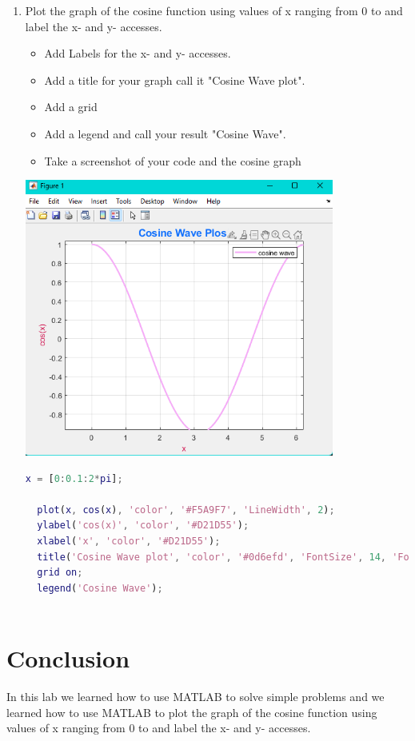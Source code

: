 \documentclass[12pt,a4paper]{article}
\begin{document}
\begin{enumerate}
\begin{lstlisting}[language=Matlab, float=h, frame=tb, label=zebra, caption={output}]
\end{lstlisting}~\\[3cm]        
\item Plot the graph of the cosine function using values of x ranging from 0 to and label the x- and y- accesses.
\begin{itemize}
  \item Add Labels for the x- and y- accesses.
  \item Add a title for your graph call it "Cosine Wave plot". 
  \item Add a grid
  \item Add a legend and call your result "Cosine Wave".
  \item Take a screenshot of your code and the cosine graph
\end{itemize}
\includegraphics[width=0.8\textwidth]{images/Picture6.png}~\\[2cm]
\begin{lstlisting}[language=Matlab,style=mystyle]
  x = [0:0.1:2*pi];

  plot(x, cos(x), 'color', '#F5A9F7', 'LineWidth', 2);
  ylabel('cos(x)', 'color', '#D21D55');
  xlabel('x', 'color', '#D21D55');
  title('Cosine Wave plot', 'color', '#0d6efd', 'FontSize', 14, 'FontName', 'Times New Roman');
  grid on;
  legend('Cosine Wave');
  
\end{lstlisting}
\end{enumerate}

\section{Conclusion}
In this lab we learned how to use MATLAB to solve simple problems and we learned how to use MATLAB to plot the graph of the cosine function using values of x ranging from 0 to and label the x- and y- accesses.

\end{document}
